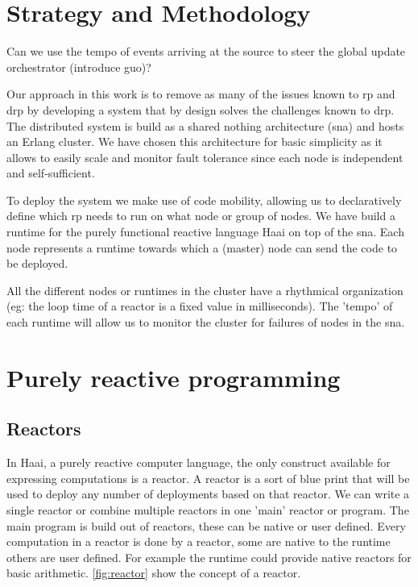 \documentclass[a4paper]{book}
\begin{document}
\chapter{Strategy and Methodology}

Can we use the tempo of events arriving at the source to steer the global update orchestrator (introduce guo)?

Our approach in this work is to remove as many of the issues known to rp and drp by developing a system that by design solves the challenges known to drp. The distributed system is build as a shared nothing architecture (sna) and hosts an Erlang cluster. We have chosen this architecture for basic simplicity as it allows to easily scale and monitor fault tolerance since each node is independent and self-sufficient.

To deploy the system we make use of code mobility, allowing us to declaratively define which rp needs to run on what node or group of nodes. We have build a runtime for the purely functional reactive language Haai on top of the sna. Each node represents a runtime towards which a (master) node can send the code to be deployed.

All the different nodes or runtimes in the cluster have a rhythmical organization (eg: the loop time of a reactor is a fixed value in milliseconds). The 'tempo' of each runtime will allow us to monitor the cluster for failures of nodes in the sna.  

\chapter{Purely reactive programming} \label{sec:prp}
\section{Reactors}
In Haai, a purely reactive computer language, the only construct available for expressing computations is a reactor. A reactor is a sort of blue print that will be used to deploy any number of deployments based on that reactor. We can write a single reactor or combine multiple reactors in one 'main' reactor or program. The main program is build out of reactors, these can be native or user defined. Every computation in a reactor is done by a reactor, some are native to the runtime others are user defined. For example the runtime could provide native reactors for basic arithmetic. \ref{fig:reactor} show the concept of a reactor.
\end{document}
